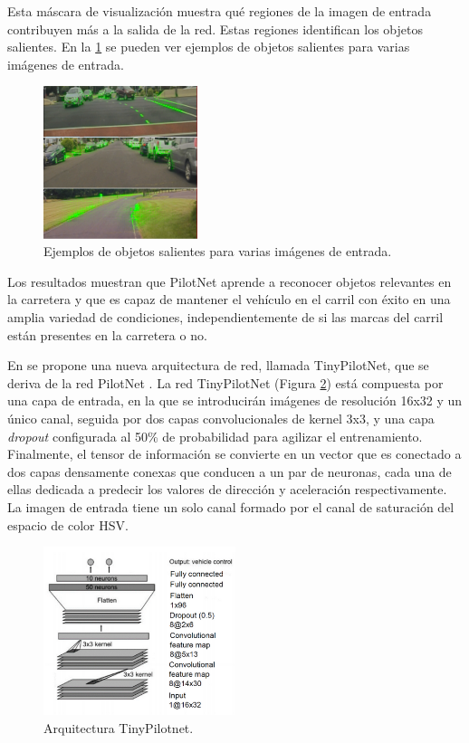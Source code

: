 Esta máscara de visualización muestra qué regiones de la imagen de entrada contribuyen más a la salida de la red. Estas regiones identifican los objetos salientes. En la \ref{fig.salient} se pueden ver ejemplos de objetos salientes para varias imágenes de entrada.

\begin{figure}
\begin{center}
	\includegraphics[width=0.4\textwidth]{img/saliencia.png}
   \caption{Ejemplos de objetos salientes para varias imágenes de entrada.}
	\label{fig.salient}
\end{center}
\end{figure}


Los resultados muestran que PilotNet aprende a reconocer objetos relevantes en la carretera y que es capaz de mantener el vehículo en el carril con éxito en una amplia variedad de condiciones, independientemente de si las marcas del carril están presentes en la carretera o no.

En \cite{self-driving} se propone una nueva arquitectura de red, llamada TinyPilotNet, que se deriva de la red PilotNet \cite{end2end} \cite{explaining-end2end}. La red TinyPilotNet (Figura \ref{fig.tinypilotnet}) está compuesta por una capa de entrada, en la que se introducirán imágenes de resolución 16x32 y un único canal, seguida por dos capas convolucionales de kernel 3x3, y una capa \textit{dropout} configurada al 50\% de probabilidad para agilizar el entrenamiento. Finalmente, el tensor de información se convierte en un vector que es conectado a dos capas densamente conexas que conducen a un par de neuronas, cada una de ellas dedicada a predecir los valores de dirección y aceleración respectivamente. La imagen de entrada tiene un solo canal formado por el canal de saturación del espacio de color HSV.

\begin{figure}
\begin{center}
	\includegraphics[width=0.5\textwidth]{img/tinypilotnet.png}
   \caption{Arquitectura TinyPilotnet.}
	\label{fig.tinypilotnet}
\end{center}
\end{figure}


